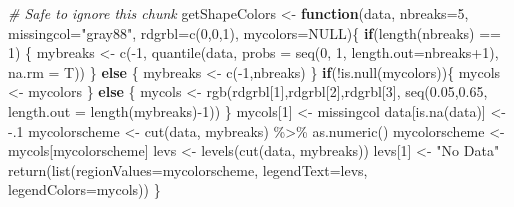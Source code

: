 \documentclass[
  openany]{book}
\newenvironment{Shaded}{\begin{snugshade}}{\end{snugshade}}
\newcommand{\AttributeTok}[1]{\textcolor[rgb]{0.77,0.63,0.00}{#1}}
\newcommand{\CommentTok}[1]{\textcolor[rgb]{0.56,0.35,0.01}{\textit{#1}}}
\newcommand{\ConstantTok}[1]{\textcolor[rgb]{0.00,0.00,0.00}{#1}}
\newcommand{\ControlFlowTok}[1]{\textcolor[rgb]{0.13,0.29,0.53}{\textbf{#1}}}
\newcommand{\DecValTok}[1]{\textcolor[rgb]{0.00,0.00,0.81}{#1}}
\newcommand{\FloatTok}[1]{\textcolor[rgb]{0.00,0.00,0.81}{#1}}
\newcommand{\FunctionTok}[1]{\textcolor[rgb]{0.00,0.00,0.00}{#1}}
\newcommand{\NormalTok}[1]{#1}
\newcommand{\OtherTok}[1]{\textcolor[rgb]{0.56,0.35,0.01}{#1}}
\newcommand{\SpecialCharTok}[1]{\textcolor[rgb]{0.00,0.00,0.00}{#1}}
\newcommand{\StringTok}[1]{\textcolor[rgb]{0.31,0.60,0.02}{#1}}
\begin{document}
\begin{Shaded}
\begin{Highlighting}[]
\CommentTok{\# Safe to ignore this chunk}
\NormalTok{getShapeColors }\OtherTok{\textless{}{-}} \ControlFlowTok{function}\NormalTok{(data, }\AttributeTok{nbreaks=}\DecValTok{5}\NormalTok{, }\AttributeTok{missingcol=}\StringTok{"gray88"}\NormalTok{, }
                           \AttributeTok{rdgrbl=}\FunctionTok{c}\NormalTok{(}\DecValTok{0}\NormalTok{,}\DecValTok{0}\NormalTok{,}\DecValTok{1}\NormalTok{), }\AttributeTok{mycolors=}\ConstantTok{NULL}\NormalTok{)\{}
  \ControlFlowTok{if}\NormalTok{(}\FunctionTok{length}\NormalTok{(nbreaks) }\SpecialCharTok{==} \DecValTok{1}\NormalTok{) \{}
\NormalTok{    mybreaks }\OtherTok{\textless{}{-}} \FunctionTok{c}\NormalTok{(}\SpecialCharTok{{-}}\DecValTok{1}\NormalTok{, }\FunctionTok{quantile}\NormalTok{(data,}
                               \AttributeTok{probs =} \FunctionTok{seq}\NormalTok{(}\DecValTok{0}\NormalTok{, }\DecValTok{1}\NormalTok{, }\AttributeTok{length.out=}\NormalTok{nbreaks}\SpecialCharTok{+}\DecValTok{1}\NormalTok{),}
                               \AttributeTok{na.rm =}\NormalTok{ T))}
\NormalTok{  \} }\ControlFlowTok{else}\NormalTok{ \{}
\NormalTok{    mybreaks }\OtherTok{\textless{}{-}} \FunctionTok{c}\NormalTok{(}\SpecialCharTok{{-}}\DecValTok{1}\NormalTok{,nbreaks)}
\NormalTok{  \}}
  \ControlFlowTok{if}\NormalTok{(}\SpecialCharTok{!}\FunctionTok{is.null}\NormalTok{(mycolors))\{}
\NormalTok{    mycols }\OtherTok{\textless{}{-}}\NormalTok{ mycolors}
\NormalTok{  \} }\ControlFlowTok{else}\NormalTok{ \{}
\NormalTok{    mycols }\OtherTok{\textless{}{-}} \FunctionTok{rgb}\NormalTok{(rdgrbl[}\DecValTok{1}\NormalTok{],rdgrbl[}\DecValTok{2}\NormalTok{],rdgrbl[}\DecValTok{3}\NormalTok{],}
                  \FunctionTok{seq}\NormalTok{(}\FloatTok{0.05}\NormalTok{,}\FloatTok{0.65}\NormalTok{, }\AttributeTok{length.out =} \FunctionTok{length}\NormalTok{(mybreaks)}\SpecialCharTok{{-}}\DecValTok{1}\NormalTok{))}
\NormalTok{  \}}
\NormalTok{  mycols[}\DecValTok{1}\NormalTok{] }\OtherTok{\textless{}{-}}\NormalTok{ missingcol}
\NormalTok{  data[}\FunctionTok{is.na}\NormalTok{(data)] }\OtherTok{\textless{}{-}} \SpecialCharTok{{-}}\NormalTok{.}\DecValTok{1}
\NormalTok{  mycolorscheme }\OtherTok{\textless{}{-}} \FunctionTok{cut}\NormalTok{(data, mybreaks) }\SpecialCharTok{\%\textgreater{}\%}
    \FunctionTok{as.numeric}\NormalTok{()}
\NormalTok{  mycolorscheme }\OtherTok{\textless{}{-}}\NormalTok{ mycols[mycolorscheme]}
\NormalTok{  levs }\OtherTok{\textless{}{-}} \FunctionTok{levels}\NormalTok{(}\FunctionTok{cut}\NormalTok{(data, mybreaks))}
\NormalTok{  levs[}\DecValTok{1}\NormalTok{] }\OtherTok{\textless{}{-}} \StringTok{"No Data"}
  \FunctionTok{return}\NormalTok{(}\FunctionTok{list}\NormalTok{(}\AttributeTok{regionValues=}\NormalTok{mycolorscheme, }
              \AttributeTok{legendText=}\NormalTok{levs, }
              \AttributeTok{legendColors=}\NormalTok{mycols))}
\NormalTok{\}}
\end{Highlighting}
\end{Shaded}
\end{document}
